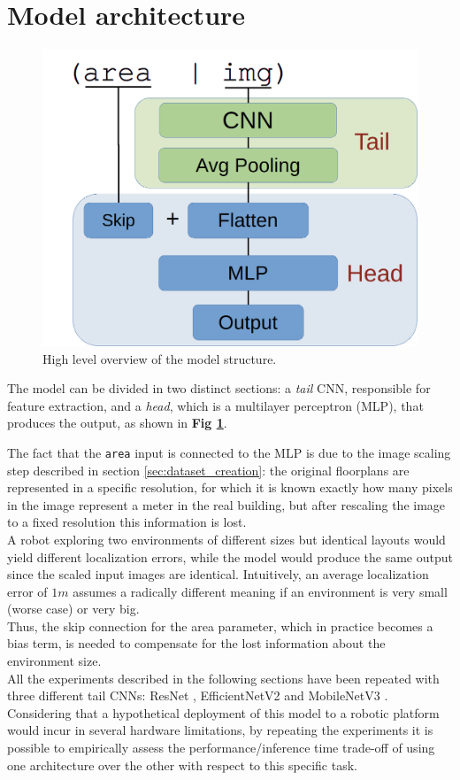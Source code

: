 
\section{Model architecture} %
\begin{figure}[htb!]
    \centering
    \includegraphics[width=0.45\linewidth]{images/cnnStruct.png}
    \caption{High level overview of the model structure.}
    \label{fig:cnn_arch}
\end{figure}

\noindent
The model can be divided in two distinct sections: a \textit{tail} CNN, responsible for feature extraction, and a \textit{head}, which is a multilayer perceptron (MLP), that produces the output, as shown in \textbf{Fig \ref{fig:cnn_arch}}. 

The fact that the \texttt{area} input is connected to the MLP is due to the image scaling step described in section \ref{sec:dataset_creation}: the original floorplans are represented in a specific resolution, for which it is known exactly how many pixels in the image represent a meter in the real building, but after rescaling the image to a fixed resolution this information is lost. \\
A robot exploring two environments of different sizes but identical layouts would yield different localization errors, while the model would produce the same output since the scaled input images are identical. Intuitively, an average localization error of $1m$ assumes a radically different meaning if an environment is very small (worse case) or very big. \\
Thus, the skip connection for the area parameter, which in practice becomes a bias term, is needed to compensate for the lost information about the environment size. \\

\noindent
All the experiments described in the following sections have been repeated with three different tail CNNs: ResNet \cite{resnet2016}, EfficientNetV2 \cite{efficientnet} and MobileNetV3 \cite{mobileNetV3_2019}. Considering that a hypothetical deployment of this model to a robotic platform would incur in several hardware limitations, by repeating the experiments it is possible to empirically assess the performance/inference time trade-off of using one architecture over the other with respect to this specific task. 

